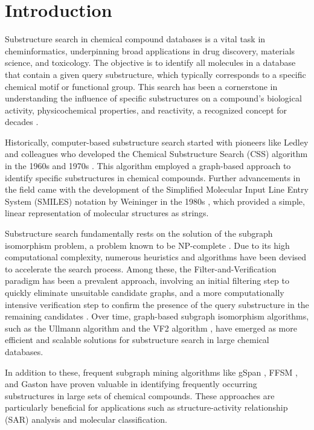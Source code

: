 \section{Introduction}
Substructure search in chemical compound databases is a vital task in cheminformatics, underpinning broad applications in drug discovery, 
materials science, and toxicology. The objective is to identify all molecules in a database that contain a given query substructure, which 
typically corresponds to a specific chemical motif or functional group. This search has been a cornerstone in understanding the influence 
of specific substructures on a compound's biological activity, physicochemical properties, and reactivity, a recognized concept for 
decades \cite{barnard1993}.

Historically, computer-based substructure search started with pioneers like Ledley and colleagues who developed the Chemical Substructure 
Search (CSS) algorithm in the 1960s and 1970s \cite{ledley1964}. This algorithm employed a graph-based approach to identify specific 
substructures in chemical compounds. Further advancements in the field came with the development of the Simplified Molecular Input 
Line Entry System (SMILES) notation by Weininger in the 1980s \cite{weininger1988}, which provided a simple, linear representation 
of molecular structures as strings.

Substructure search fundamentally rests on the solution of the subgraph isomorphism problem, a problem known to be NP-complete \cite{ullmann1976}. 
Due to its high computational complexity, numerous heuristics and algorithms have been devised to accelerate the search process. 
Among these, the Filter-and-Verification paradigm has been a prevalent approach, involving an initial filtering step to quickly 
eliminate unsuitable candidate graphs, and a more computationally intensive verification step to confirm the presence of the query 
substructure in the remaining candidates \cite{cordella2004, shasha2002}. Over time, graph-based subgraph isomorphism algorithms, 
such as the Ullmann algorithm \cite{ullmann1976} and the VF2 algorithm \cite{cordella2004}, have emerged as more efficient and 
scalable solutions for substructure search in large chemical databases.

In addition to these, frequent subgraph mining algorithms like gSpan \cite{yan2002}, FFSM \cite{kuramochi2001}, and Gaston \cite{nijssen2004} 
have proven valuable in identifying frequently occurring substructures in large sets of chemical compounds. These approaches 
are particularly beneficial for applications such as structure-activity relationship (SAR) analysis and molecular classification.

